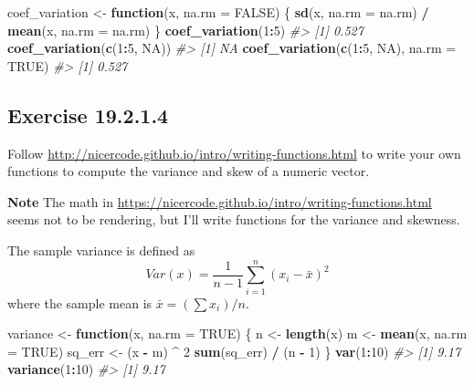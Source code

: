 \documentclass[]{book}
\newenvironment{Shaded}{\begin{snugshade}}{\end{snugshade}}
\newcommand{\CommentTok}[1]{\textcolor[rgb]{0.56,0.35,0.01}{\textit{#1}}}
\newcommand{\ControlFlowTok}[1]{\textcolor[rgb]{0.13,0.29,0.53}{\textbf{#1}}}
\newcommand{\DataTypeTok}[1]{\textcolor[rgb]{0.13,0.29,0.53}{#1}}
\newcommand{\DecValTok}[1]{\textcolor[rgb]{0.00,0.00,0.81}{#1}}
\newcommand{\KeywordTok}[1]{\textcolor[rgb]{0.13,0.29,0.53}{\textbf{#1}}}
\newcommand{\NormalTok}[1]{#1}
\newcommand{\OperatorTok}[1]{\textcolor[rgb]{0.81,0.36,0.00}{\textbf{#1}}}
\newcommand{\OtherTok}[1]{\textcolor[rgb]{0.56,0.35,0.01}{#1}}
\newcommand{\StringTok}[1]{\textcolor[rgb]{0.31,0.60,0.02}{#1}}
\theoremstyle{plain}
\theoremstyle{remark}
\begin{document}
\begin{Shaded}
\begin{Highlighting}[]
\NormalTok{coef_variation <-}\StringTok{ }\ControlFlowTok{function}\NormalTok{(x, }\DataTypeTok{na.rm =} \OtherTok{FALSE}\NormalTok{) \{}
  \KeywordTok{sd}\NormalTok{(x, }\DataTypeTok{na.rm =}\NormalTok{ na.rm) }\OperatorTok{/}\StringTok{ }\KeywordTok{mean}\NormalTok{(x, }\DataTypeTok{na.rm =}\NormalTok{ na.rm)}
\NormalTok{\}}
\KeywordTok{coef_variation}\NormalTok{(}\DecValTok{1}\OperatorTok{:}\DecValTok{5}\NormalTok{)}
\CommentTok{#> [1] 0.527}
\KeywordTok{coef_variation}\NormalTok{(}\KeywordTok{c}\NormalTok{(}\DecValTok{1}\OperatorTok{:}\DecValTok{5}\NormalTok{, }\OtherTok{NA}\NormalTok{))}
\CommentTok{#> [1] NA}
\KeywordTok{coef_variation}\NormalTok{(}\KeywordTok{c}\NormalTok{(}\DecValTok{1}\OperatorTok{:}\DecValTok{5}\NormalTok{, }\OtherTok{NA}\NormalTok{), }\DataTypeTok{na.rm =} \OtherTok{TRUE}\NormalTok{)}
\CommentTok{#> [1] 0.527}
\end{Highlighting}
\end{Shaded}

\hypertarget{exercise-19.2.1.4}{%
\subsection*{\texorpdfstring{Exercise
{19.2.1.4}}{Exercise 19.2.1.4}}\label{exercise-19.2.1.4}}

Follow \url{http://nicercode.github.io/intro/writing-functions.html} to
write your own functions to compute the variance and skew of a numeric
vector.

\textbf{Note} The math in
\url{https://nicercode.github.io/intro/writing-functions.html} seems not
to be rendering, but I'll write functions for the variance and skewness.

The sample variance is defined as \[
Var(x) = \frac{1}{n - 1} \sum_{i=1}^n (x_i - \bar{x}) ^2
\] where the sample mean is \(\bar{x} = (\sum x_i) / n\).

\begin{Shaded}
\begin{Highlighting}[]
\NormalTok{variance <-}\StringTok{ }\ControlFlowTok{function}\NormalTok{(x, }\DataTypeTok{na.rm =} \OtherTok{TRUE}\NormalTok{) \{}
\NormalTok{  n <-}\StringTok{ }\KeywordTok{length}\NormalTok{(x)}
\NormalTok{  m <-}\StringTok{ }\KeywordTok{mean}\NormalTok{(x, }\DataTypeTok{na.rm =} \OtherTok{TRUE}\NormalTok{)}
\NormalTok{  sq_err <-}\StringTok{ }\NormalTok{(x }\OperatorTok{-}\StringTok{ }\NormalTok{m) }\OperatorTok{^}\StringTok{ }\DecValTok{2}
  \KeywordTok{sum}\NormalTok{(sq_err) }\OperatorTok{/}\StringTok{ }\NormalTok{(n }\OperatorTok{-}\StringTok{ }\DecValTok{1}\NormalTok{)}
\NormalTok{\}}
\KeywordTok{var}\NormalTok{(}\DecValTok{1}\OperatorTok{:}\DecValTok{10}\NormalTok{)}
\CommentTok{#> [1] 9.17}
\KeywordTok{variance}\NormalTok{(}\DecValTok{1}\OperatorTok{:}\DecValTok{10}\NormalTok{)}
\CommentTok{#> [1] 9.17}
\end{Highlighting}
\end{Shaded}
\end{document}
